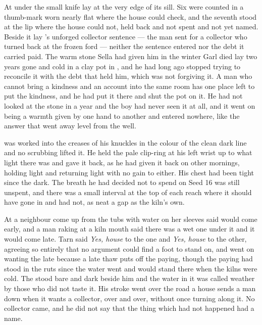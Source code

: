 At  under  the small knife lay at the very edge of its sill. Six were counted in a thumb-mark worn nearly flat where the house could check, and the seventh stood at the lip where the house could not, held back and not spent and not yet named. Beside it lay 's unforged collector sentence --- the man sent for a collector who turned back at the frozen ford --- neither the sentence entered nor the debt it carried paid. The warm stone Sella had given him in the winter Garl died lay two years gone and cold in a clay pot in , and he had long ago stopped trying to reconcile it with the debt that held him, which was not forgiving it. A man who cannot bring a kindness and an account into the same room has one place left to put the kindness, and he had put it there and shut the pot on it. He had not looked at the stone in a year and the boy had never seen it at all, and it went on being a warmth given by one hand to another and entered nowhere, like the answer that went away level from the well.

 was worked into the creases of his knuckles in the colour of the clean dark line and no scrubbing lifted it. He held the pale clip-ring at his left wrist up to what light there was and gave it back, as he had given it back on other mornings, holding light and returning light with no gain to either. His chest had been tight since the dark. The breath he had decided not to spend on Seed 16 was still unspent, and there was a small interval at the top of each reach where it should have gone in and had not, as neat a gap as the kiln's own.

At  a neighbour come up from the tubs with water on her sleeves said  would come early, and a man raking at a kiln mouth said there was a wet one under it and it would come late. Tarn said \emph{Yes, house} to the one and \emph{Yes, house} to the other, agreeing so entirely that no argument could find a foot to stand on, and went on wanting the late because a late thaw puts off the paying, though the paying had stood in the ruts since the water went and would stand there when the kilns were cold. The  stood bare and dark beside him and the water in it was called weather by those who did not taste it. His stroke went over the road a house sends a man down when it wants a collector, over and over, without once turning along it. No collector came, and he did not say that the thing which had not happened had a name.

